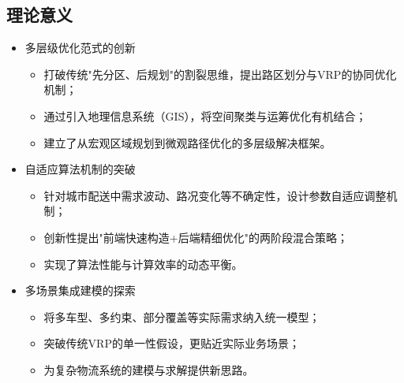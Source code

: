\documentclass[12pt,a4paper,twoside]{ctexbook}
\begin{document}
\subsection{理论意义}
\begin{itemize}
    \item 多层级优化范式的创新
    \begin{itemize}
        \item 打破传统"先分区、后规划"的割裂思维，提出路区划分与VRP的协同优化机制；
        \item 通过引入地理信息系统（GIS），将空间聚类与运筹优化有机结合；
        \item 建立了从宏观区域规划到微观路径优化的多层级解决框架。
    \end{itemize}
    
    \item 自适应算法机制的突破
    \begin{itemize}
        \item 针对城市配送中需求波动、路况变化等不确定性，设计参数自适应调整机制；
        \item 创新性提出"前端快速构造+后端精细优化"的两阶段混合策略；
        \item 实现了算法性能与计算效率的动态平衡。
    \end{itemize}
    
    \item 多场景集成建模的探索
    \begin{itemize}
        \item 将多车型、多约束、部分覆盖等实际需求纳入统一模型；
        \item 突破传统VRP的单一性假设，更贴近实际业务场景；
        \item 为复杂物流系统的建模与求解提供新思路。
    \end{itemize}
\end{itemize}
\end{document}
